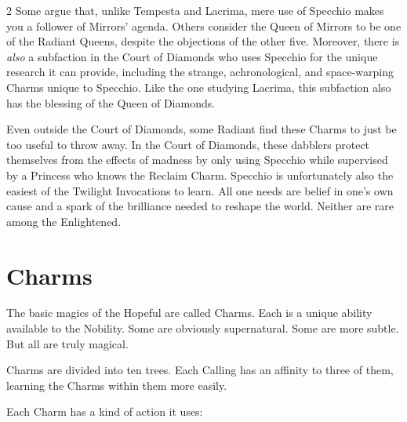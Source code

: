 \begin{multicols}{2}
Some argue that, unlike Tempesta and Lacrima, mere use of Specchio makes you a follower of Mirrors' agenda. Others consider the Queen of Mirrors to be one of the Radiant Queens, despite the objections of the other five. Moreover, there is \textit{also} a subfaction in the Court of Diamonds who uses Specchio for the unique research it can provide, including the strange, achronological, and space-warping Charms unique to Specchio. Like the one studying Lacrima, this subfaction also has the blessing of the Queen of Diamonds.

Even outside the Court of Diamonds, some Radiant find these Charms to just be too useful to throw away. In the Court of Diamonds, these dabblers protect themselves from the effects of madness by only using Specchio while supervised by a Princess who knows the Reclaim Charm. Specchio is unfortunately also the easiest of the Twilight Invocations to learn. All one needs are belief in one's own cause and a spark of the brilliance needed to reshape the world. Neither are rare among the Enlightened.

\bigsidebarend

\section*{Charms}
\label{sec:Charms}
The basic magics of the Hopeful are called Charms. Each is a unique ability available to the Nobility. Some are obviously supernatural. Some are more subtle. But all are truly magical. 

Charms are divided into ten trees. Each Calling has an affinity to three of them, learning the Charms within them more easily. 

Each Charm has a kind of action it uses: 


\end{multicols}
